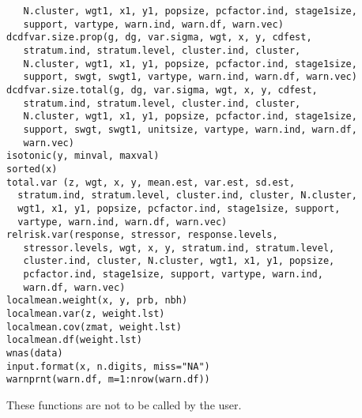 \begin{Usage}
\begin{verbatim}
   N.cluster, wgt1, x1, y1, popsize, pcfactor.ind, stage1size,
   support, vartype, warn.ind, warn.df, warn.vec)
dcdfvar.size.prop(g, dg, var.sigma, wgt, x, y, cdfest,
   stratum.ind, stratum.level, cluster.ind, cluster,
   N.cluster, wgt1, x1, y1, popsize, pcfactor.ind, stage1size,
   support, swgt, swgt1, vartype, warn.ind, warn.df, warn.vec)
dcdfvar.size.total(g, dg, var.sigma, wgt, x, y, cdfest,
   stratum.ind, stratum.level, cluster.ind, cluster,
   N.cluster, wgt1, x1, y1, popsize, pcfactor.ind, stage1size,
   support, swgt, swgt1, unitsize, vartype, warn.ind, warn.df,
   warn.vec)
isotonic(y, minval, maxval)
sorted(x)
total.var (z, wgt, x, y, mean.est, var.est, sd.est,
  stratum.ind, stratum.level, cluster.ind, cluster, N.cluster,
  wgt1, x1, y1, popsize, pcfactor.ind, stage1size, support,
  vartype, warn.ind, warn.df, warn.vec)
relrisk.var(response, stressor, response.levels,
   stressor.levels, wgt, x, y, stratum.ind, stratum.level,
   cluster.ind, cluster, N.cluster, wgt1, x1, y1, popsize,
   pcfactor.ind, stage1size, support, vartype, warn.ind,
   warn.df, warn.vec)
localmean.weight(x, y, prb, nbh)
localmean.var(z, weight.lst)
localmean.cov(zmat, weight.lst)
localmean.df(weight.lst)
wnas(data)
input.format(x, n.digits, miss="NA")
warnprnt(warn.df, m=1:nrow(warn.df))
\end{verbatim}
\end{Usage}
\begin{Details}\relax
These functions are not to be called by the user.
\end{Details}

